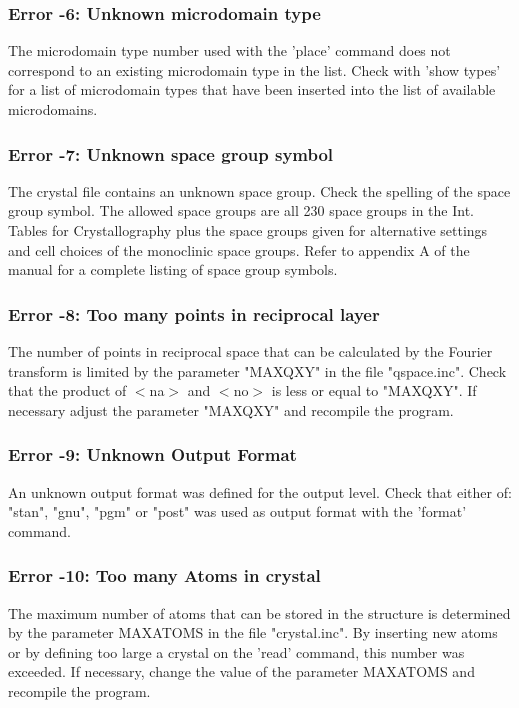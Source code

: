 \subsubsection{Error -6: Unknown microdomain type}
\par
The microdomain type number used with the 'place' command does not 
correspond to an existing microdomain type in the list. Check with 
'show types' for a list of microdomain types that have been inserted 
into the list of available microdomains. 
\subsubsection{Error -7: Unknown space group symbol}
\par
The crystal file contains an unknown space group. Check the spelling of 
the space group symbol. The allowed space groups are all 230 space 
groups in the Int. Tables for Crystallography plus the space groups 
given for alternative settings and cell choices of the monoclinic 
space groups. 
Refer to appendix A of the manual for a complete listing of space 
group symbols. 
\subsubsection{Error -8: Too many points in reciprocal layer}
\par
The number of points in reciprocal space that can be calculated by the 
Fourier transform is limited by the parameter "MAXQXY" in the file 
"qspace.inc". Check that the product of $ <$na$> $ and $ <$no$> $ is less or equal 
to "MAXQXY". If necessary adjust the parameter "MAXQXY" and recompile 
the program. 
\subsubsection{Error -9: Unknown Output Format}
\par
An unknown output format was defined for the output level. Check 
that either of: "stan", "gnu", "pgm" or "post" was used as output 
format with the 'format' command. 
\subsubsection{Error -10: Too many Atoms in crystal}
\par
The maximum number of atoms that can be stored in the structure 
is determined by the parameter MAXATOMS in the file "crystal.inc". 
By inserting new atoms or by defining too large a crystal on the 
'read' command, this number was exceeded. If necessary, change the 
value of the parameter MAXATOMS and recompile the program. 
